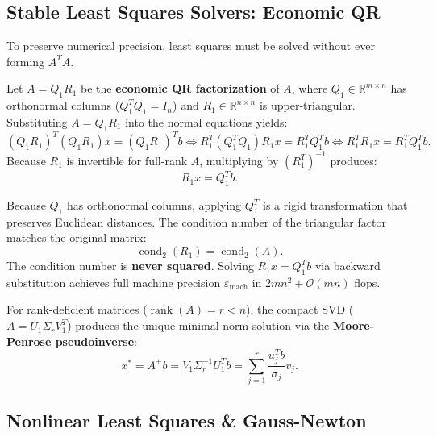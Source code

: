 \subsection{Stable Least Squares Solvers: Economic QR}

To preserve numerical precision, least squares must be solved without ever forming $A^T A$.

\begin{theorem}
    Let $A = Q_1 R_1$ be the \textbf{economic QR factorization} of $A$, where $Q_1 \in \mathbb{R}^{m \times n}$ has orthonormal columns ($Q_1^T Q_1 = I_n$) and $R_1 \in \mathbb{R}^{n \times n}$ is upper-triangular. Substituting $A = Q_1 R_1$ into the normal equations yields:
    \begin{equation}
        (Q_1 R_1)^T (Q_1 R_1) x = (Q_1 R_1)^T b \iff R_1^T (Q_1^T Q_1) R_1 x = R_1^T Q_1^T b \iff R_1^T R_1 x = R_1^T Q_1^T b.
    \end{equation}
    Because $R_1$ is invertible for full-rank $A$, multiplying by $(R_1^T)^{-1}$ produces:
    \begin{equation}
        R_1 x = Q_1^T b.
    \end{equation}
\end{theorem}

Because $Q_1$ has orthonormal columns, applying $Q_1^T$ is a rigid transformation that preserves Euclidean distances. The condition number of the triangular factor matches the original matrix:
\begin{equation}
    \operatorname{cond}_2(R_1) = \operatorname{cond}_2(A).
\end{equation}
The condition number is \textbf{never squared}. Solving $R_1 x = Q_1^T b$ via backward substitution achieves full machine precision $\varepsilon_{\text{mach}}$ in $2m n^2 + \mathcal{O}(m n)$ flops.

For rank-deficient matrices ($\operatorname{rank}(A) = r < n$), the compact SVD ($A = U_1 \Sigma_r V_1^T$) produces the unique minimal-norm solution via the \textbf{Moore-Penrose pseudoinverse}:
\begin{equation}
    x^* = A^+ b = V_1 \Sigma_r^{-1} U_1^T b = \sum_{j=1}^{r} \frac{u_j^T b}{\sigma_j} v_j.
\end{equation}

\subsection{Nonlinear Least Squares \& Gauss-Newton}


